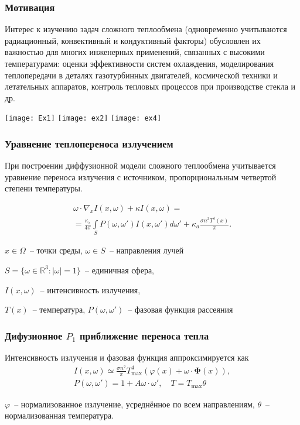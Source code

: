 \begin{frame}
    \setcounter{framenumber}{1}
    \maketitle
\end{frame}


\begin{frame}
    \frametitle{Мотивация}
    Интерес к изучению задач сложного теплообмена
    (одновременно учитываются радиационный, конвективный и кондуктивный факторы)
    обусловлен их важностью для многих
    инженерных применений, связанных с высокими температурами: оценки
    эффективности систем охлаждения, моделирования теплопередачи в деталях
    газотурбинных двигателей, космической техники и летательных аппаратов,
    контроль тепловых процессов при производстве стекла и др.

    \texttt{[image: Ex1]}
    \hfill
    \texttt{[image: ex2]}
    \hfill
    \texttt{[image: ex4]}
\end{frame}

\begin{frame}
    \frametitle{Уравнение теплопереноса излучением}
    При построении диффузионной модели сложного теплообмена
    учитывается уравнение переноса излучения с источником,
    пропорциональным четвертой степени температуры.

    \begin{gather*}
        \omega \cdot \nabla_x I(x, \omega) +
        \kappa I(x,\omega) = \\
        = \frac{\kappa_s}{4\pi}\int\limits_S P(\omega, \omega')I(x,\omega')d\omega' +
        \kappa_a\frac{\sigma n^2 T^4(x)}{\pi}.
    \end{gather*}


    $x \in \Omega$~-- точки среды, $\omega \in S$~-- направления лучей

    $S = \{\omega \in \mathbb R^3 \colon |\omega| = 1\}$~-- единичная сфера,

    $I(x,\omega)$~-- интенсивность излучения,

    $T(x)$~-- температура, $P(\omega,\omega')$~-- фазовая функция рассеяния
\end{frame}

\begin{frame}
    \frametitle{Дифузионное $P_1$ приближение переноса тепла}
    Интенсивность излучения и фазовая функция аппроксимируется как
    \begin{gather*}
        I(x,\omega) \simeq \frac{\sigma n^2}{\pi}T_{\mathrm{max}}^4
        \left(  \varphi(x) + \omega \cdot \mathbf \Phi(x)  \right),\\
        P(\omega,\omega') = 1 + A\omega\cdot\omega', \quad T = T_{\max}\theta
    \end{gather*}

    \vspace{0.4cm}
    $\varphi$~-- нормализованное излучение, усреднённое по всем направлениям,
    $\theta$~-- нормализованная температура.

\end{frame}


